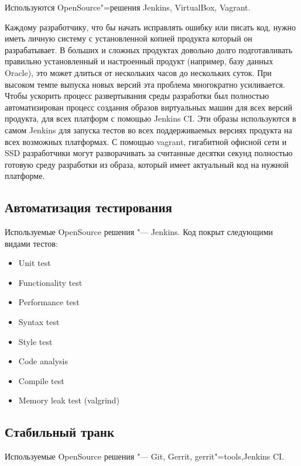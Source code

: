 \documentclass[10pt, a5paper]{article}
\begin{document}
Используются OpenSource"=решения Jenkins, VirtualBox, Vagrant.

Каждому разработчику, что бы начать исправлять ошибку или писать код, нужно иметь личную систему с установленной копией продукта который он разрабатывает. В больших и сложных продуктах довольно долго подготавливать правильно установленный и настроенный продукт (например, базу данных Oracle), это может длиться от нескольких часов до нескольких суток. При высоком темпе выпуска новых версий эта проблема многократно усиливается. Чтобы ускорить процесс развертывания среды разработки был полностью автоматизирован процесс создания образов виртуальных машин для всех версий продукта, для всех платформ с помощью Jenkins CI. Эти образы используются в самом Jenkins для запуска тестов во всех поддерживаемых версиях продукта на всех возможных платформах. С помощью vagrant, гигабитной офисной сети и SSD разработчики могут разворачивать за считанные десятки секунд полностью готовую среду разработки из образа, который имеет актуальный код на нужной платформе.

\subsection*{Автоматизация тестирования}

Используемые OpenSource решения "--- Jenkins.
Код покрыт следующими видами тестов:

\begin{itemize}
  \item Unit test
  \item Functionality test
  \item Performance test
  \item Syntax test
  \item Style test
  \item Code analysis
  \item Compile test
  \item Memory leak test (valgrind)
\end{itemize}

\subsection*{Стабильный транк}

Используемые OpenSource решения "--- Git, Gerrit, gerrit"=tools,\linebreak Jenkins CI.

~

~
\end{document}
